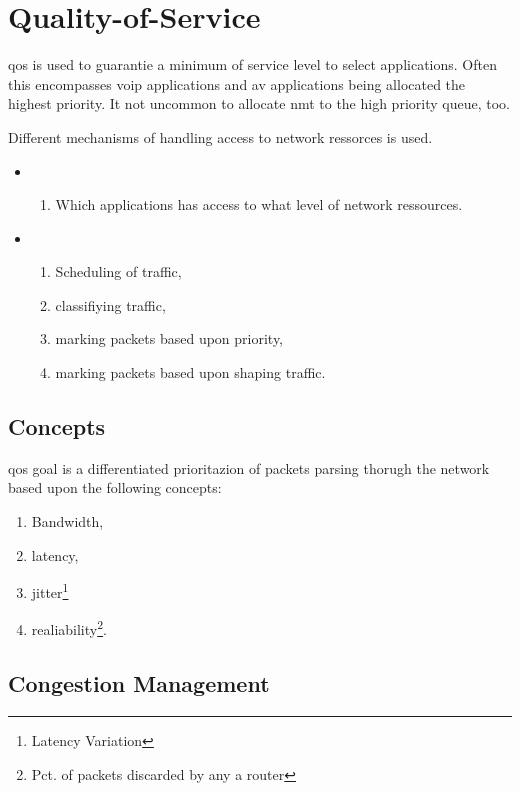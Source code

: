 \chapter[QoS]{Quality-of-Service}

\gls{qos} is used to guarantie a minimum of service level to select applications. Often this encompasses \gls{voip} applications and \gls{av} applications being allocated the highest priority. It not uncommon to allocate \gls{nmt} to the high priority queue, too.

Different mechanisms of handling access to network ressorces is used.
\begin{itemize}
    \item {}
    \begin{enumerate}
        \item Which applications has access to what level of network ressources.
    \end{enumerate}
    \item {}
    \begin{enumerate}
        \item Scheduling of traffic,
        \item classifiying traffic,
        \item marking packets based upon priority,
        \item marking packets based upon shaping traffic.
    \end{enumerate}
\end{itemize}

\section{Concepts}

\gls{qos} goal is a differentiated prioritazion of packets parsing thorugh the network based upon the following concepts:
\begin{enumerate}
    \item Bandwidth,
    \item latency,
    \item jitter\footnote{Latency Variation}
    \item realiability\footnote{Pct. of packets discarded by any a router}.
\end{enumerate}

\section[Congestion Mgmt]{Congestion Management}

